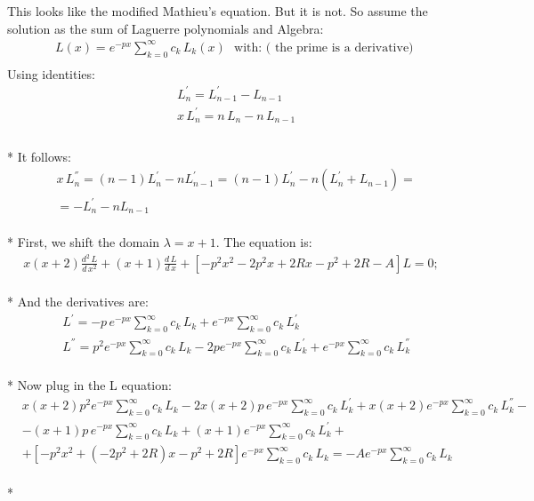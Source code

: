 \documentclass[11pt, oneside]{article}   	%
\begin{document}
This looks like the modified Mathieu's equation. But it is not. So assume the solution as the sum of Laguerre polynomials and Algebra:
\begin{equation}
\begin{split}
& L(x) =  e^{-px}\sum_{k=0}^{\infty}{c_k\,L_k(x)}\,\,\text{ with: ( the prime is a derivative) } \\[.8em]
\end{split}
\end{equation}
Using identities:
\begin{equation}
\begin{split}
& L_n^{'} = L_{n-1}^{'} - L_{n-1} \\[.8em]
& x\,L_n^{'} = n\,L_n  - n\,L_{n-1} \\[.8em]
\end{split}
\end{equation}\\*
It follows:
\begin{equation}
\begin{split}
& x\,L_n^{''} = (n-1)L_n^{'} - nL_{n-1}^{'} = (n-1)L_n^{'} - n(L_n^{'} + L_{n-1}) = \\[.8em]
& = -L_n^{'} - nL_{n-1}
\end{split}
\end{equation}\\*
First, we shift the domain $ \lambda = x + 1 $. The equation is:
\begin{equation}
\begin{split}
x(x +2)\frac{d^2\,L}{d\,x^2} + (x+1)\frac{d\,L}{d\,x} + \left[ -p^2x^2  -2p^2x + 2Rx - p^2 + 2R - A \right] L = 0;
\end{split}
\end{equation}\\*
And the derivatives are:
\begin{equation}
\begin{split}
& L^{'} =  -p\,e^{-px}\sum_{k=0}^{\infty}{c_k\,L_k} + e^{-px}\sum_{k=0}^{\infty}{c_k\,L_k^{'}} \\[.8em]
& L^{''} = p^2 e^{-px}\sum_{k=0}^{\infty}{c_k\,L_k} - 2 p e^{-px}\sum_{k=0}^{\infty}{c_k\,L_k^{'}} + e^{-px}\sum_{k=0}^{\infty}{c_k\,L_k^{''}}  
\end{split} 
\end{equation}\\*
Now plug in the L equation:
\begin{equation}
\begin{split}
& x(x +2)p^2 e^{-px}\sum_{k=0}^{\infty}{c_k\,L_k} - 2x(x +2)p\,e^{-px}\sum_{k=0}^{\infty}{c_k\,L_k^{'}} + x(x +2)e^{-px}\sum_{k=0}^{\infty}{c_k\,L_k^{''}} - \\[.8em]
& -(x+1)p\,e^{-px}\sum_{k=0}^{\infty}{c_k\,L_k} + (x+1)e^{-px}\sum_{k=0}^{\infty}{c_k\,L_k^{'}} + \\[.8em]
& + \left[  -p^2x^2 + (-2p^2 + 2R)x - p^2 + 2R \right] e^{-px}\sum_{k=0}^{\infty}{c_k\,L_k} = -A  e^{-px}\sum_{k=0}^{\infty}{c_k\,L_k}
\end{split}
\end{equation}\\*
\end{document}
